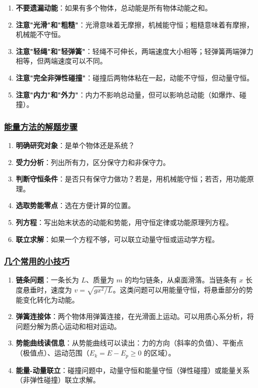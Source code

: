 \begin{enumerate}
    \item \textbf{不要遗漏动能}：如果有多个物体，总动能是所有物体动能之和。
    \item \textbf{注意"光滑"和"粗糙"}：光滑意味着无摩擦，机械能守恒；粗糙意味着有摩擦，机械能不守恒。
    \item \textbf{注意"轻绳"和"轻弹簧"}：轻绳不可伸长，两端速度大小相等；轻弹簧两端弹力相等，但两端速度可以不同。
    \item \textbf{注意"完全非弹性碰撞"}：碰撞后两物体粘在一起，动能不守恒，但动量守恒。
    \item \textbf{注意"内力"和"外力"}：内力不影响总动量，但可以影响总动能（如爆炸、碰撞）。
\end{enumerate}

\subsubsection{\protect\hyperlink{:}{能量方法的解题步骤}}

\begin{enumerate}
    \item \textbf{明确研究对象}：是单个物体还是系统？
    \item \textbf{受力分析}：列出所有力，区分保守力和非保守力。
    \item \textbf{判断守恒条件}：是否只有保守力做功？若是，用机械能守恒；若否，用功能原理。
    \item \textbf{选取势能零点}：选在方便计算的位置。
    \item \textbf{列方程}：写出始末状态的动能和势能，用守恒定律或功能原理列方程。
    \item \textbf{联立求解}：如果一个方程不够，可以联立动量守恒或运动学方程。
\end{enumerate}

\subsubsection{\protect\hyperlink{:}{几个常用的小技巧}}

\begin{enumerate}
    \item \textbf{链条问题}：一条长为 $L$、质量为 $m$ 的均匀链条，从桌面滑落。当链条有 $x$ 长度悬垂时，速度为 $v = \sqrt{gx^2/L}$。这类问题可以用能量守恒，将悬垂部分的势能变化转化为动能。
    \item \textbf{弹簧连接体}：两个物体用弹簧连接，在光滑面上运动。可以用质心系分析，将问题分解为质心运动和相对运动。
    \item \textbf{势能曲线读信息}：从势能曲线可以读出：力的方向（斜率的负值）、平衡点（极值点）、运动范围（$E_k = E - E_p \geq 0$ 的区域）。
    \item \textbf{能量-动量联立}：碰撞问题中，动量守恒和能量守恒（弹性碰撞）或能量关系（非弹性碰撞）联立求解。
\end{enumerate}


